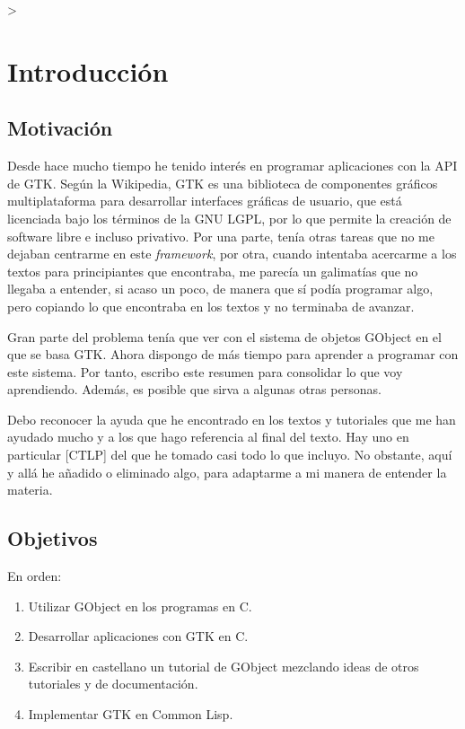 >%
%

\section{Introducción}

\subsection{Motivación} \label{subsec:motivacion}
Desde hace mucho tiempo he tenido interés en programar aplicaciones con la API de GTK.
Según la Wikipedia, GTK es una biblioteca de componentes gráficos multiplataforma para desarrollar
interfaces gráficas de usuario, que está licenciada bajo los términos de la GNU LGPL, por lo que
permite la creación de software libre e incluso privativo.
Por una parte, tenía otras tareas que no me dejaban centrarme en este \textit{framework},
por otra, cuando intentaba acercarme a los textos para principiantes que encontraba, me parecía un
galimatías que no llegaba a entender, si acaso un poco, de manera que sí podía programar algo, pero
copiando lo que encontraba en los textos y no terminaba de avanzar.

Gran parte del problema tenía que ver con el sistema de objetos \textsf{GObject} en el que se basa GTK.
Ahora dispongo de más tiempo para aprender a programar con este sistema. Por tanto, escribo este
resumen para consolidar  lo que voy aprendiendo. Además, es posible que sirva a algunas otras personas.

Debo reconocer la ayuda que he encontrado en los textos y tutoriales que me han ayudado mucho y
a los que hago referencia al final del texto. Hay uno en particular [CTLP] del que he tomado casi todo lo
que incluyo. No obstante, aquí y allá he añadido o eliminado algo, para adaptarme a mi manera de entender
la materia.
\subsection{Objetivos} \label{subsec:objetivos}
En orden:
\begin{enumerate}
  \tightlist
\item Utilizar \textsf{GObject} en los programas en C.
\item Desarrollar aplicaciones con GTK en C.
\item Escribir en castellano un tutorial de GObject mezclando ideas de otros tutoriales y de documentación.
\item Implementar GTK en Common Lisp.
\end{enumerate}

